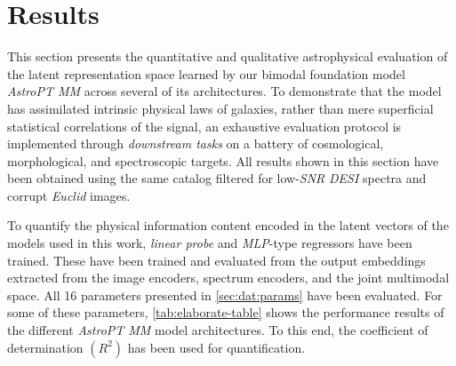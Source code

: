 \section{Results} \label{sec:res}

This section presents the quantitative and qualitative astrophysical evaluation of the latent representation space learned by our bimodal foundation model \textit{AstroPT MM} across several of its architectures. To demonstrate that the model has assimilated intrinsic physical laws of galaxies, rather than mere superficial statistical correlations of the signal, an exhaustive evaluation protocol is implemented through \textit{downstream tasks} on a battery of cosmological, morphological, and spectroscopic targets. All results shown in this section have been obtained using the same catalog filtered for low-\textit{\gls{SNR}} \textit{\gls{DESI}} spectra and corrupt \textit{Euclid} images.

To quantify the physical information content encoded in the latent vectors of the models used in this work, \textit{linear probe} and \textit{\gls{MLP}}-type regressors have been trained. These have been trained and evaluated from the output embeddings extracted from the image encoders, spectrum encoders, and the joint multimodal space. All 16 parameters presented in \cref{sec:dat:params} have been evaluated. For some of these parameters, \cref{tab:elaborate-table} shows the performance results of the different \textit{AstroPT MM} model architectures. To this end, the coefficient of determination $\left(R^2\right)$ has been used for quantification.


